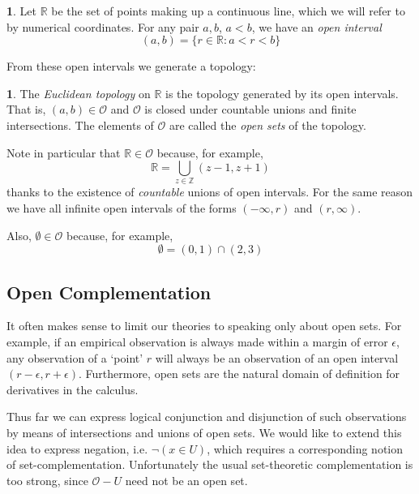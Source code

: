 \documentclass[oneside,english]{article}
\theoremstyle{plain}
\theoremstyle{definition}
\newtheorem{defn}[thm]{\protect\definitionname}
\theoremstyle{definition}
\providecommand{\definitionname}{Definition}
\begin{document}
\begin{defn}
	Let $\mathbb{R}$ be the set of points making up a continuous line, which we will refer to by numerical coordinates. For any pair $a, b$, $a < b$, we have an \emph{open interval}
	\[
		(a, b) = \{r\in\mathbb{R} : a < r < b\}
	\]
\end{defn}

From these open intervals we generate a topology:

\begin{defn}
	The \emph{Euclidean topology} on $\mathbb{R}$ is the topology generated by its open intervals. That is, $(a, b)\in\mathscr{O}$ and $\mathscr{O}$ is closed under countable unions and finite intersections. The elements of $\mathscr{O}$ are called the \emph{open sets} of the topology.
\end{defn}

Note in particular that $\mathbb{R}\in\mathscr{O}$ because, for example,
\[
	\mathbb{R} = \bigcup_{z\in\mathbb{Z}} (z-1, z+1)
\]
thanks to the existence of \emph{countable} unions of open intervals. For the same reason we have all infinite open intervals of the forms $(-\infty, r)$ and $(r, \infty)$.

Also, $\emptyset\in\mathscr{O}$ because, for example,
\[
\emptyset = (0, 1)\cap (2, 3)
\]

\subsection{Open Complementation}

It often makes sense to limit our theories to speaking only about open sets. For example, if an empirical observation is always made within a margin of error $\epsilon$, any observation of a `point' $r$ will always be an observation of an open interval $(r-\epsilon, r+\epsilon)$. Furthermore, open sets are the natural domain of definition for derivatives in the calculus.

Thus far we can express logical conjunction and disjunction of such observations by means of intersections and unions of open sets. We would like to extend this idea to express negation, i.e. $\lnot(x\in U)$, which requires a corresponding notion of set-complementation. Unfortunately the usual set-theoretic complementation is too strong, since $\mathscr{O}- U$ need not be an open set.
\end{document}
